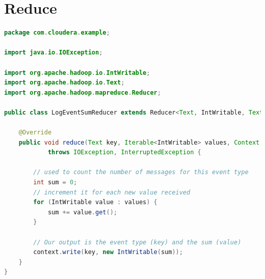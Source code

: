 \section{Reduce} \label{sec:hadoop-reduce}
\begin{lstlisting}[language=Java, commentstyle=\color{pgreen}, keywordstyle=\color{pblue}, stringstyle=\color{pred},basicstyle=\fontsize{6}{5}\selectfont\ttfamily, xleftmargin=0.8cm]
package com.cloudera.example;

import java.io.IOException;

import org.apache.hadoop.io.IntWritable;
import org.apache.hadoop.io.Text;
import org.apache.hadoop.mapreduce.Reducer;

public class LogEventSumReducer extends Reducer<Text, IntWritable, Text, IntWritable> {

    @Override
    public void reduce(Text key, Iterable<IntWritable> values, Context context) 
            throws IOException, InterruptedException {

        // used to count the number of messages for this event type
        int sum = 0;
        // increment it for each new value received
        for (IntWritable value : values) {
            sum += value.get();
        }

        // Our output is the event type (key) and the sum (value)
        context.write(key, new IntWritable(sum));
    }
}
\end{lstlisting}